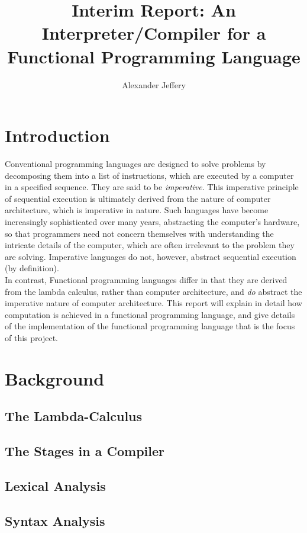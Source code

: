\documentclass{article}
\title{\textbf{Interim Report}: An Interpreter/Compiler for a Functional Programming Language}
\author{Alexander Jeffery}
\begin{document}
\maketitle

\section{Introduction}

Conventional programming languages are designed to solve problems by decomposing them into a list of instructions, which are executed by a computer in a specified sequence. They are said to be \emph{imperative}. This imperative principle of sequential execution is ultimately derived from the nature of computer architecture, which is imperative in nature. Such languages have become increasingly sophisticated over many years, abstracting the computer's hardware, so that programmers need not concern themselves with understanding the intricate details of the computer, which are often irrelevant to the problem they are solving. Imperative languages do not, however, abstract sequential execution (by definition). \\
In contrast, Functional programming languages differ in that they are derived from the lambda calculus, rather than computer architecture, and \emph{do} abstract the imperative nature of computer architecture. This report will explain in detail how computation is achieved in a functional programming language, and give details of the implementation of the functional programming language that is the focus of this project.

\section{Background}
\subsection{The Lambda-Calculus}
\subsection{The Stages in a Compiler}
\subsection{Lexical Analysis}
\subsection{Syntax Analysis}
\end{document}

